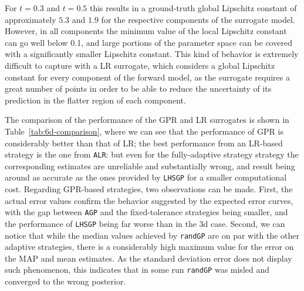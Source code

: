 For $t=0.3$ and $t=0.5$ this results in a ground-truth global Lipschitz constant of approximately $ 5.3$ and $1.9$ for the respective components of the surrogate model.
However, in all components the minimum value of the local Lipschitz constant can go well below 0.1, and large portions of the parameter space can be covered with a significantly smaller Lipschitz constant.
This kind of behavior is extremely difficult to capture with a LR surrogate, which considers a global Lipschitz constant for every component of the forward model, as the surrogate requires a great number of points in order to be able to reduce the uncertainty of its prediction in the flatter region of each component.\medskip

The comparison of the performance of the GPR and LR surrogates is shown in Table~\ref{tab:6d-comparison}, where we can see that the performance of GPR is considerably better than that of LR; the best performance from an LR-based strategy is the one from \texttt{ALR}: but even for the fully-adaptive strategy strategy the corresponding estimates are unreliable and substantially 
wrong, and result being around as accurate as the ones provided by \texttt{LHSGP} for a smaller computational cost.
Regarding GPR-based strategies, two observations can be made.
First, the actual error values confirm the behavior suggested by the expected error curves, with the gap between \texttt{AGP} and the fixed-tolerance strategies being smaller, and the performance of \texttt{LHSGP} being far worse than in the 3d case.
Second, we can notice that while the median values achieved by \texttt{randGP} are on par with the other adaptive strategies, there is a considerably high maximum value for the error on the MAP and mean estimates.
As the standard deviation error does not display such phenomenon, this indicates that in some run \texttt{randGP} was misled and converged to the wrong posterior.

